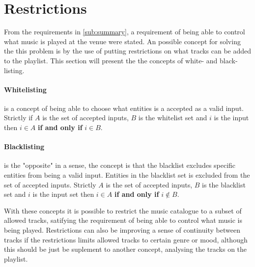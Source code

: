 \section{Restrictions}

From the requirements in \cref{sub:summary}, a requirement of being able to control what music is played at the venue were stated. An possible concept for solving the this problem is by the use of putting restrictions on what tracks can be added to the playlist. This section will present the the concepts of white- and black-listing.

\paragraph{Whitelisting} is a concept of being able to choose what entities is a accepted as a valid input. Strictly if $A$ is the set of accepted inputs, $B$ is the whitelist set and $i$ is the input then $i \in A$ \textbf{if and only if} $i \in B$.

\paragraph{Blacklisting} is the "opposite" in a sense, the concept is that the blacklist excludes specific entities from being a valid input. Entities in the blacklist set is excluded from the set of accepted inputs. Strictly $A$ is the set of accepted inputs, $B$ is the blacklist set and $i$ is the input set then $i \in A$ \textbf{if and only if} $i \notin B$.



With these concepts it is possible to restrict the music catalogue to a subset of allowed tracks, satifying the requirement of being able to control what music is being played. Restrictions can also be improving a sense of continuity between tracks if the restrictions limits allowed tracks to certain genre or mood, although this should be just be suplement to another concept, analysing the tracks on the playlist.